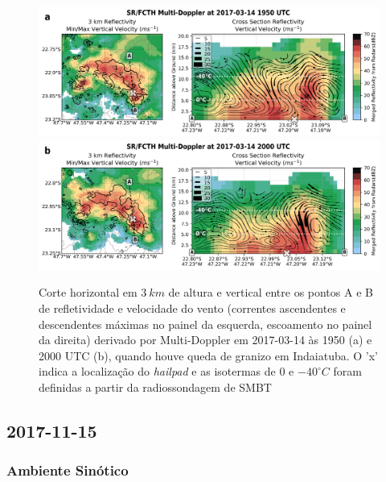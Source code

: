 \begin{figure}[hbt]
	\centering
	\caption{Corte horizontal em $3\:km$ de altura e vertical entre os pontos A e B de refletividade e velocidade do vento (correntes ascendentes e descendentes máximas no painel da esquerda, escoamento no painel da direita) derivado por Multi-Doppler em 2017-03-14 às 1950 (a) e 2000 UTC (b), quando houve queda de granizo em Indaiatuba. O 'x' indica a localização do \textit{hailpad} e as isotermas de $0$ e $-40^{\circ}C$ foram definidas a partir da radiossondagem de SMBT} 
	\label{doppler_20170314_2}
	\vspace{-5pt}
	\includegraphics[width=\columnwidth]{../MultiDoppler_Processing/figures/SR-FCTH 2017-03-14 1950 UTC.png} \\
	\vspace{-5pt}
	\includegraphics[width=\columnwidth]{../MultiDoppler_Processing/figures/SR-FCTH 2017-03-14 2000 UTC.png} \\
\end{figure}

\subsection{2017-11-15}

\subsubsection{Ambiente Sinótico}\label{sinotica_20171115}

